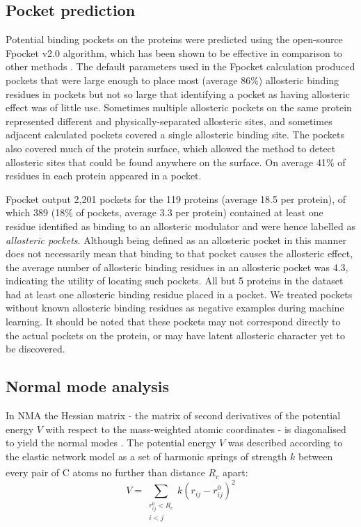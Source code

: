 \subsection{Pocket prediction}

Potential binding pockets on the proteins were predicted using the open-source Fpocket v2.0 algorithm, which has been shown to be effective in comparison to other methods \cite{LeGuilloux2009}.
The default parameters used in the Fpocket calculation produced pockets that were large enough to place most (average 86\%) allosteric binding residues in pockets but not so large that identifying a pocket as having allosteric effect was of little use.
Sometimes multiple allosteric pockets on the same protein represented different and physically-separated allosteric sites, and sometimes adjacent calculated pockets covered a single allosteric binding site.
The pockets also covered much of the protein surface, which allowed the method to detect allosteric sites that could be found anywhere on the surface.
On average 41\% of residues in each protein appeared in a pocket.

Fpocket output 2,201 pockets for the 119 proteins (average 18.5 per protein), of which 389 (18\% of pockets, average 3.3 per protein) contained at least one residue identified as binding to an allosteric modulator and were hence labelled as \emph{allosteric pockets}.
Although being defined as an allosteric pocket in this manner does not necessarily mean that binding to that pocket causes the allosteric effect, the average number of allosteric binding residues in an allosteric pocket was 4.3, indicating the utility of locating such pockets.
All but 5 proteins in the dataset had at least one allosteric binding residue placed in a pocket.
We treated pockets without known allosteric binding residues as negative examples during machine learning.
It should be noted that these pockets may not correspond directly to the actual pockets on the protein, or may have latent allosteric character yet to be discovered.


\subsection{Normal mode analysis}

In NMA the Hessian matrix - the matrix of second derivatives of the potential energy $V$ with respect to the mass-weighted atomic coordinates - is diagonalised to yield the normal modes \cite{Hayward2008}.
The potential energy $V$ was described according to the elastic network model \cite{Tirion1996} as a set of harmonic springs of strength $k$ between every pair of C\textsuperscript{\textalpha} atoms no further than distance $R_{c}$ apart:
$$
V = \sum_{\substack{r_{ij}^{0} < R_{c} \\ i < j}} k (r_{ij} - r_{ij}^{0})^{2}
$$

